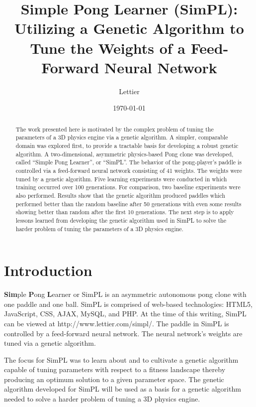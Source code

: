 \documentclass[a4paper,10pt]{article}
\title{Simple Pong Learner (SimPL): Utilizing a Genetic Algorithm to Tune the Weights of a Feed-Forward Neural Network}
\date{\today}
\author{Lettier}
\begin{document}
\maketitle

\begin{abstract}

The work presented here is motivated by the complex problem of tuning the parameters of a 3D physics engine via a genetic algorithm. A simpler, comparable domain was explored first, to provide a tractable basis for developing a robust genetic algorithm. A two-dimensional, asymmetric physics-based Pong clone was developed, called ``Simple Pong Learner'', or ``SimPL''.  The behavior of the pong-player's paddle is controlled via a feed-forward neural network consisting of 41 weights. The weights were tuned by a genetic algorithm. Five learning experiments were conducted in which training occurred over 100 generations. For comparison, two baseline experiments were also performed. Results show that the genetic algorithm produced paddles which performed better than the random baseline after 50 generations with even some results showing better than random after the first 10 generations. The next step is to apply lessons learned from developing the genetic algorithm used in SimPL to solve the harder problem of tuning the parameters of a 3D physics engine.

\end{abstract}

\section{Introduction}

\textbf{Sim}ple \textbf{P}ong \textbf{L}earner or SimPL is an asymmetric autonomous pong clone with one paddle and one ball. SimPL is comprised of web-based technologies: HTML5, JavaScript, CSS, AJAX, MySQL, and PHP. At the time of this writing, SimPL can be viewed at http://www.lettier.com/simpl/. The paddle in SimPL is controlled by a feed-forward neural network. The neural network's weights are tuned via a genetic algorithm. 

The focus for SimPL was to learn about and to cultivate a genetic algorithm capable of tuning parameters with respect to a fitness landscape thereby producing an optimum solution to a given parameter space. The genetic algorithm developed for SimPL will be used as a basis for a genetic algorithm needed to solve a harder problem of tuning a 3D physics engine. 
\end{document}

